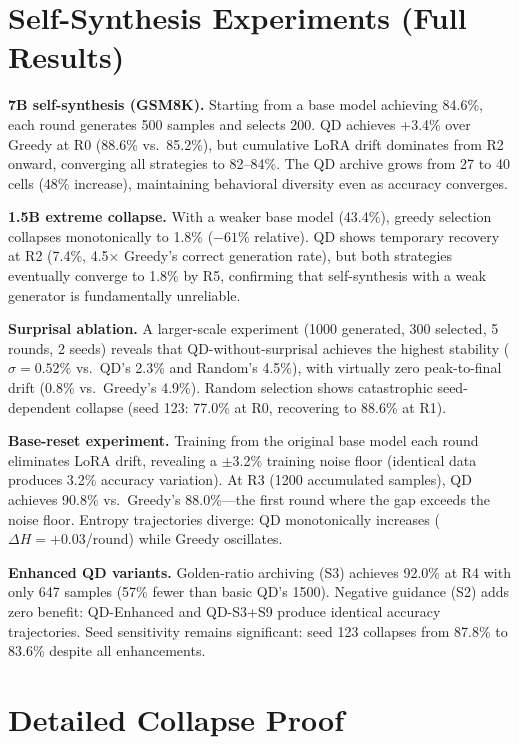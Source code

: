 \documentclass{article}
\begin{document}
\begin{enumerate}[nosep]
\section{Self-Synthesis Experiments (Full Results)}
\label{sec:app_selfsynth}

\textbf{7B self-synthesis (GSM8K).}
Starting from a base model achieving 84.6\%, each round generates 500 samples and selects 200.
QD achieves +3.4\% over Greedy at R0 (88.6\% vs.\ 85.2\%), but cumulative LoRA drift dominates from R2 onward, converging all strategies to 82--84\%.
The QD archive grows from 27 to 40 cells (48\% increase), maintaining behavioral diversity even as accuracy converges.

\textbf{1.5B extreme collapse.}
With a weaker base model (43.4\%), greedy selection collapses monotonically to 1.8\% ($-61\%$ relative).
QD shows temporary recovery at R2 (7.4\%, 4.5$\times$ Greedy's correct generation rate), but both strategies eventually converge to 1.8\% by R5, confirming that self-synthesis with a weak generator is fundamentally unreliable.

\textbf{Surprisal ablation.}
A larger-scale experiment (1000 generated, 300 selected, 5 rounds, 2 seeds) reveals that QD-without-surprisal achieves the highest stability ($\sigma{=}0.52\%$ vs.\ QD's 2.3\% and Random's 4.5\%), with virtually zero peak-to-final drift (0.8\% vs.\ Greedy's 4.9\%).
Random selection shows catastrophic seed-dependent collapse (seed 123: 77.0\% at R0, recovering to 88.6\% at R1).

\textbf{Base-reset experiment.}
Training from the original base model each round eliminates LoRA drift, revealing a $\pm$3.2\% training noise floor (identical data produces 3.2\% accuracy variation).
At R3 (1200 accumulated samples), QD achieves 90.8\% vs.\ Greedy's 88.0\%---the first round where the gap exceeds the noise floor.
Entropy trajectories diverge: QD monotonically increases ($\Delta H{=}{+}0.03$/round) while Greedy oscillates.

\textbf{Enhanced QD variants.}
Golden-ratio archiving (S3) achieves 92.0\% at R4 with only 647 samples (57\% fewer than basic QD's 1500).
Negative guidance (S2) adds zero benefit: QD-Enhanced and QD-S3+S9 produce identical accuracy trajectories.
Seed sensitivity remains significant: seed 123 collapses from 87.8\% to 83.6\% despite all enhancements.

\section{Detailed Collapse Proof}
\label{sec:proof}


\end{enumerate}
\end{document}

